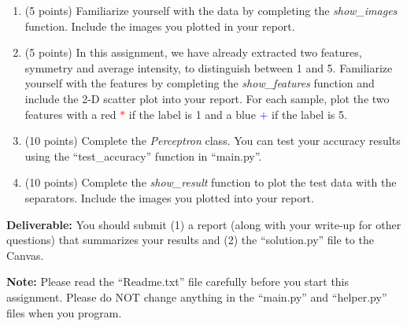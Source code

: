 \documentclass[11pt]{article}
\begin{document}
\begin{enumerate}
\begin{enumerate}
\item (5 points) Familiarize yourself with the data by completing the \emph{show\_images} function. Include the images you plotted in your report.
\item (5 points) In this assignment, we have already extracted two features, symmetry and
average intensity, to distinguish between 1 and 5. Familiarize
yourself with the features by completing the \emph{show\_features}
function and include the 2-D scatter plot into your report. For each
sample, plot the two features with a red \textcolor{red}{$*$} if the
label is 1 and a blue \textcolor{blue}{$+$}  if the label is 5.
\item (10 points) Complete the \emph{Perceptron} class. You can test your
accuracy results using the ``test\_accuracy'' function in
``main.py''.
\item (10 points) Complete the \emph{show\_result} function to plot the
test data with the separators. Include the images you plotted into
your report.
\end{enumerate}

\textbf{Deliverable:} You should submit (1) a report
(along with your write-up for other questions) that summarizes your
results and (2) the ``solution.py'' file to the Canvas.

\textbf{Note:} Please read the ``Readme.txt'' file carefully before
you start this assignment. Please do {\color{red} NOT} change anything in the
``main.py'' and ``helper.py'' files when you program.

\end{enumerate}
\end{document}
